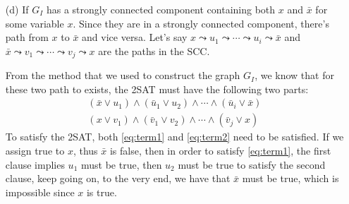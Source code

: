 \documentclass[twoside]{homework}
\begin{document}
\begin{enumerate}

		\newcommand{\xbar}{\bar{x}}
		\newcommand{\ubar}{\bar{u}}
		\newcommand{\vbar}{\bar{v}}
		\item [(d)] If $G_I$ has a strongly connected component containing both $x$ and $\bar{x}$ for some variable $x$. Since they are in a strongly connected component, there's path from $x$ to $\bar{x}$ and vice versa. Let's say $x  \leadsto u_1 \leadsto \cdots \leadsto u_i \leadsto \bar{x} $ and $\bar{x}  \leadsto v_1 \leadsto \cdots \leadsto v_j \leadsto x$ are the paths in the SCC.

		From the method that we used to construct the graph $G_I$, we know that for these two path to exists, the 2SAT must have the following two parts:
		\begin{align}
			(\xbar \lor u_1) \land (\ubar_1 \lor u_2) \land \cdots \land (\ubar_i \lor \xbar) \label{eq:term1}\\
			(x \lor v_1) \land (\vbar_1 \lor v_2) \land \cdots \land (\vbar_j \lor x) \label{eq:term2}
		\end{align}
		To satisfy the 2SAT, both \ref{eq:term1} and \ref{eq:term2} need to be satisfied. If we assign true to $x$, thus $\bar{x}$ is false, then in order to satisfy \ref{eq:term1}, the first clause implies $u_1$ must be true, then $u_2$ must be true to satisfy the second clause, keep going on, to the very end, we have that $\bar{x}$ must be true, which is impossible since $x$ is true.


\end{enumerate}
\end{document}
